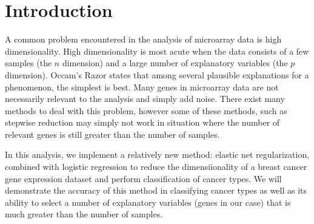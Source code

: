 \documentclass[12pt,a4paper]{article}
\begin{document}
\pagebreak

\nocite{*}

\section{Introduction}
A common problem encountered in the analysis of microarray data is high dimensionality. High dimensionality is most acute when the data consists of a few samples (the $n$ dimension) and a large number of explanatory variables (the $p$ dimension). Occam's Razor states that among several plausible explanations for a phenomenon, the simplest is best. Many genes in microarray data are not necessarily relevant to the analysis and simply add noise. There exist many methods to deal with this problem, however some of these methods, such as stepwise reduction may simply not work in situation where the number of relevant genes is still greater than the number of samples.\\
\par In this analysis, we implement a relatively new method: elastic net regularization, combined with logistic regression to reduce the dimensiionality of a breast cancer gene expression dataset and perform classification of cancer types. We will demonstrate the accuracy of this method in classifying cancer types as well as its ability to select a number of explanatory variables (genes in our case) that is much greater than the number of samples. 
\end{document}
